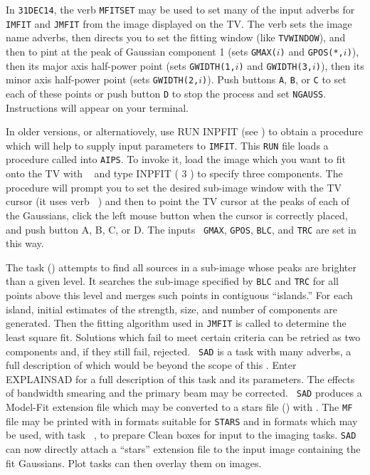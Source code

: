      In {\tt 31DEC14}, the verb {\tt MFITSET} may be used to set many
of the input adverbs for {\tt IMFIT} and {\tt JMFIT} from the image
displayed on the TV.  The verb sets the image name adverbs, then
directs you to set the fitting window (like {\tt TVWINDOW}), and then
to pint at the peak of Gaussian component 1 (sets {\tt GMAX($i$)} and
{\tt GPOS(*,$i$)}), then its major axis half-power point (sets
{\tt GWIDTH(1,$i$)} and {\tt GWIDTH(3,$i$)}), then its minor axis
half-power point (sets {\tt GWIDTH(2,$i$)}).  Push buttons {\tt A},
{\tt B}, or {\tt C} to set each of these points or push button {\tt D}
to stop the process and set {\tt NGAUSS}\@.  Instructions will appear
on your terminal.

     In older versions, or alternatiovely, use {\us RUN INPFIT \CR}
(see ) to obtain a procedure which will help to supply
input parameters to {\tt IMFIT}\@.  This {\tt RUN} file loads a
procedure called {\tt {}} into \hbox{{\tt AIPS}}. To invoke
it, load the image which you want to fit onto the TV with {\tt
{}} and type {\us INPFIT ( 3 ) \CR} to specify three
components.  The procedure will prompt you to set the desired
sub-image window with the TV cursor (it uses verb {\tt
{}}) and then to point the TV cursor at the peaks of each
of the Gaussians, click the left mouse button when the cursor is
correctly placed, and push button A, B, C, or D\@.  The inputs {\tt
GMAX}, {\tt GPOS}, {\tt BLC}, and {\tt TRC} are set in this way.


The task {\tt {}} () attempts to find all sources
in a sub-image whose peaks are brighter than a given level.  It
searches the sub-image specified by {\tt BLC} and {\tt TRC} for all
points above this level and merges such points in contiguous
``islands.''  For each island, initial estimates of the strength,
size, and number of components are generated.  Then the fitting
algorithm used in {\tt JMFIT} is called to determine the least square
 fit. Solutions which fail to meet certain criteria can
be retried as two components and, if they still fail, rejected.  {\tt
SAD} is a task with many adverbs, a full description of which would be
beyond the scope of this \Cookbook.  Enter {\us EXPLAIN\qs SAD \CR}
for a full description of this task and its parameters.  The effects
of bandwidth smearing and the primary beam may be corrected.  {\tt
SAD} produces a Model-Fit extension file which may be converted to a
stars file () with {\tt {}}\@.  The {\tt MF}
file may be printed with {\tt {}} in formats suitable for
{\tt STARS} and in formats which may be used, with task {\tt
{}}, to prepare Clean boxes for input to the imaging
tasks.  {\tt SAD} can now directly attach a ``stars'' extension file
to the input image containing the fit Gaussians.  Plot tasks can then
overlay them on images.

